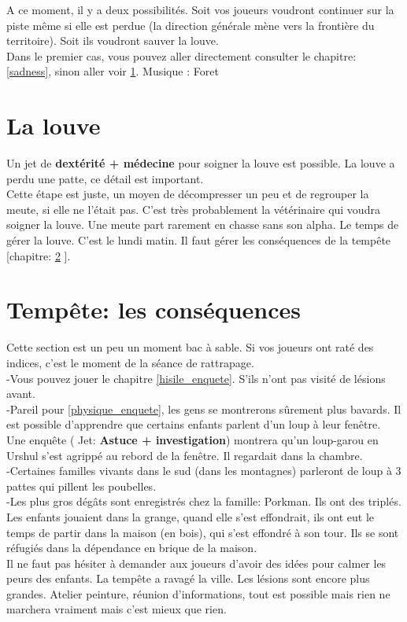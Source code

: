 \documentclass[oneside,12pt]{book}
\newcommand\roll[1]{
( Jet: \textbf{#1})
}
\begin{document}
\begin{flushleft}
A ce moment, il y a deux possibilités. Soit vos joueurs voudront continuer sur la piste même si elle est perdue (la direction générale mène vers la frontière du territoire). Soit ils voudront sauver la louve.\\
Dans le premier cas, vous pouvez aller directement consulter le chapitre: \ref{sadness}, sinon aller voir \ref{louve}.
Musique : Foret 



\section{La louve}
\label{louve}
Un jet de \textbf{dextérité + médecine} pour soigner la louve est possible. 
La louve a perdu une patte, ce détail est important. \\ 
Cette étape est juste, un moyen de décompresser un peu et de regrouper la meute, si elle ne l'était pas. 
C'est très probablement la vétérinaire qui voudra soigner la louve. 
Une meute part rarement en chasse sans son alpha. 
Le temps de gérer la louve. C'est le lundi matin. 
Il faut gérer les conséquences de la tempête [chapitre: \ref{consequence} ]. \\


\section{Tempête: les conséquences}
\label{consequence}
Cette section est un peu un moment bac à sable. Si vos joueurs ont raté des indices, c'est le moment de la séance de rattrapage. \\
-Vous pouvez jouer le chapitre \ref{hisile_enquete}. S'ils n'ont pas visité de lésions avant.\\
-Pareil pour \ref{physique_enquete}, les gens se montrerons sûrement plus bavards. Il est possible d'apprendre que certains enfants parlent d'un loup à leur fenêtre. Une enquête \roll{Astuce + investigation} montrera qu'un loup-garou en Urshul s'est agrippé au rebord de la fenêtre. Il regardait dans la chambre.\\
-Certaines familles vivants dans le sud (dans les montagnes) parleront de loup à 3 pattes qui pillent les poubelles.\\
-Les plus gros dégâts sont enregistrés chez la famille: Porkman. Ils ont des triplés. Les enfants jouaient dans la grange, quand elle s'est effondrait, 
ils ont eut le temps de partir dans la maison (en bois), qui s'est effondré à son tour. Ils se sont réfugiés dans la dépendance en brique de la maison.\\
Il ne faut pas hésiter à demander aux joueurs d'avoir des idées pour calmer les peurs des enfants. La tempête a ravagé la ville. Les lésions sont encore plus grandes. Atelier peinture, réunion d'informations, tout est possible mais rien ne marchera vraiment mais c'est mieux que rien.


\end{flushleft}
\end{document}
